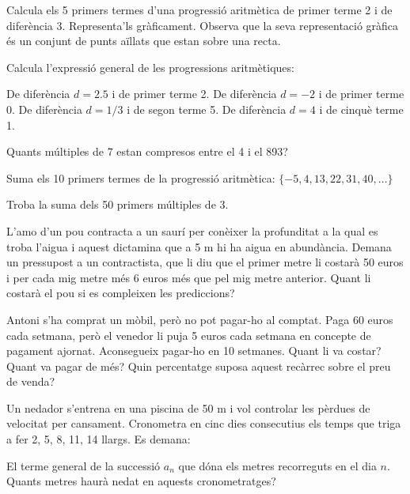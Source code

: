 \begin{mylist}
\exer  Calcula els 5 primers termes d'una progressió aritmètica de primer terme 2 i de diferència 3. Representa'ls gràficament. Observa que la seva representació gràfica és un conjunt de punts aïllats que estan sobre una recta.

\exer  Calcula l'expressió general de les progressions aritmètiques:

\begin{tasks}
	\task De diferència $d = 2.5$ i de primer terme 2.
	\task De diferència $d = -2$ i de primer terme 0.
	\task De diferència $d = 1/3$ i de segon terme 5.
	\task  De diferència $d = 4$ i de cinquè terme 1.
\end{tasks}
 \answers[cols=1]{[$a_n=2+2.5(n-1)$, $a_n=0-2(n-1)$, $a_n=\frac{14}{3}+\frac{1}{3}(n-1)$, $a_n=-15+4(n-1)$]}


\exer Quants múltiples de 7 estan compresos entre el 4 i el 893?

\exer[1]  Suma els 10 primers termes de la progressió aritmètica: $\{-5, 4, 13, 22, 31, 40, {\dots}\}$

\exer[1]  Troba la suma dels 50 primers múltiples de 3.
	

\exer[1]  L'amo d'un pou contracta a un saurí per conèixer la profunditat a la qual es troba l'aigua i aquest dictamina que a 5 m hi ha aigua en abundància. Demana un pressupost a un contractista, que li diu que el primer metre li costarà 50 euros i per cada mig metre més 6 euros més que pel mig metre anterior. Quant li costarà el pou si es compleixen les prediccions? 
\answers{98 \euro{}}
	
\exer  Antoni s'ha comprat un mòbil, però no pot pagar-ho al comptat. Paga 60 euros cada setmana, però el venedor li puja 5 euros cada setmana en concepte de pagament ajornat. Aconsegueix pagar-ho en 10 setmanes. Quant li va costar? Quant va pagar de més? Quin percentatge suposa aquest recàrrec sobre el preu de venda?
	
\exer  Un nedador s'entrena en una piscina de 50 m i vol controlar les pèrdues de velocitat per cansament. Cronometra en cinc dies consecutius els temps que triga a fer 2, 5, 8, 11, 14 llargs. Es demana:

\begin{tasks}
	\task El terme general de la successió $a_n$ que dóna els metres recorreguts en el dia $n$.
	\task  Quants metres haurà nedat en aquests cronometratges?
\end{tasks} 
\answers{[$a_n =100 + 150 (n – 1)$, 100; 250; 400; 550 i 700 metres]}
  

\end{mylist}


